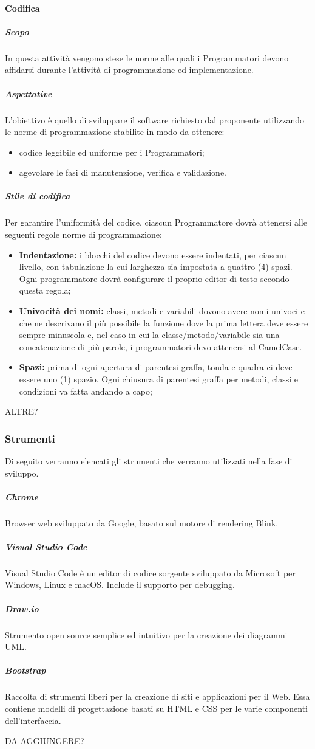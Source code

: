 			\paragraph{Codifica}
				\subparagraph{Scopo}	
					In questa attività vengono stese le norme alle quali i Programmatori devono affidarsi durante l’attività di  programmazione ed implementazione.
				\subparagraph{Aspettative}
					 L’obiettivo è quello di sviluppare il software richiesto dal proponente utilizzando le norme di programmazione stabilite in modo da ottenere:
					 	\begin{itemize}
					 	\item codice leggibile ed uniforme per i Programmatori;
					 	\item agevolare le fasi di manutenzione, verifica e validazione.
					 \end{itemize} 
				 \subparagraph{Stile di codifica}
				 	Per garantire l'uniformità del codice, ciascun Programmatore dovrà attenersi alle seguenti regole norme di programmazione: 
					\begin{itemize}
						\item \textbf{Indentazione:} i blocchi del codice devono essere indentati, per ciascun livello, con tabulazione la cui larghezza sia impostata a quattro (4) spazi. Ogni programmatore dovrà configurare il proprio editor di testo secondo questa regola;
						\item \textbf{Univocità dei nomi:} classi, metodi e variabili dovono avere nomi univoci e che ne descrivano il più possibile la funzione dove la prima lettera deve essere sempre minuscola e, nel caso in cui la classe/metodo/variabile sia una concatenazione di più parole, i programmatori devo attenersi al CamelCase.
						\item \textbf{Spazi:} prima di ogni apertura di parentesi graffa, tonda e quadra ci deve essere uno (1) spazio. Ogni chiusura di parentesi graffa per metodi, classi e condizioni va fatta andando a capo;
					\end{itemize}
					ALTRE?
					
				 
		\subsubsection{Strumenti}
			Di seguito verranno elencati gli strumenti che verranno utilizzati nella fase di sviluppo.
				\subparagraph{Chrome \\}
					Browser web sviluppato da Google, basato sul motore di rendering Blink.
				\subparagraph{Visual Studio Code \\}
					Visual Studio Code è un editor di codice sorgente sviluppato da Microsoft per Windows, Linux e macOS. Include il supporto per debugging.
				\subparagraph{Draw.io \\}
					Strumento open source semplice ed  intuitivo per la creazione dei diagrammi UML.
				\subparagraph{Bootstrap \\}
					Raccolta di strumenti liberi per la creazione di siti e applicazioni per il Web. Essa contiene modelli di progettazione basati su HTML e CSS per le varie componenti dell'interfaccia.
				
					DA AGGIUNGERE?
			
